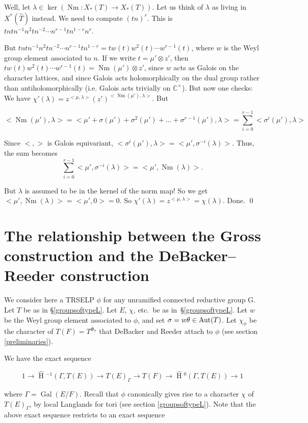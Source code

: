 \documentclass[11pt]{amsart}
\theoremstyle{plain}
\newcommand{\HT}[1]{\hat{\HH}{}^{#1}}
\theoremstyle{definition}
\DeclareMathOperator{\Gal}{Gal}
\DeclareMathOperator{\HH}{H}
\DeclareMathOperator{\Nm}{Nm}
\begin{document}
Well, let $\lambda \in \ker(\Nm : X_*(T) \rightarrow X_*(T))$.  Let us
think of $\lambda$ as living in $X^*(\hat{T})$ instead.  We need to
compute $(tn)^r$.  This is $t ntn^{-1} n^2 t n^{-2} \cdots n^{r-1} t n^{1-r} n^r$.

But $t ntn^{-1} n^2 t n^{-2} \cdots n^{r-1} t n^{1-r} = t w(t) w^2(t) \cdots w^{r-1}(t)$,
where $w$ is the Weyl group element associated to $n$.  If we write
$t = \mu' \otimes z'$, then $t w(t) w^2(t) \cdots w^{r-1}(t) = \Nm(\mu' ) \otimes z'$,
since $w$ acts as Galois on the character lattices, and since Galois
acts holomorphically on the dual group rather than antiholomorphically
(i.e. Galois acts trivially on $\mathbb{C}^\times$).  But now one checks:
We have $\chi'(\lambda) = z^{<\mu, \lambda>} (z' )^{<\Nm(\mu'), \lambda>}$.  But

$$<\Nm(\mu'), \lambda> = < \mu' + \sigma(\mu') + \sigma^2(\mu') + ... + \sigma^{r-1}(\mu'), \lambda>
  = \displaystyle\sum_{i=0}^{r-1} < \sigma^i(\mu'), \lambda >$$

Since $< , >$ is Galois equivariant, $<\sigma^i(\mu'), \lambda> =
<\mu', \sigma^{-i}(\lambda)>$.  Thus, the sum
becomes
$$\displaystyle\sum_{i=0}^{r-1} <\mu', \sigma^{-i}(\lambda)> = <\mu', \Nm(\lambda)>.$$

But $\lambda$ is assumed to be in the kernel of the norm map!  So we
get $<\mu', \Nm(\lambda)> = <\mu', 0> = 0$.  So
$\chi'(\lambda) = z^{<\mu, \lambda>} = \chi(\lambda)$.  Done.
\qed

\section{The relationship between the Gross construction and the DeBacker--Reeder construction}\label{grossdebackerreeder}

We consider here a TRSELP $\phi$ for any unramified connected
reductive group G.  Let $T$ be as in \S\ref{groupsoftypeL}.  Let $E$,
$\chi$, etc.~be as in~\S\ref{groupsoftypeL}.  Let $w$ be the Weyl
group element associated to $\phi$, and set $\sigma = w \theta\in {\rm Aut}(T)$.
Let $\chi_{\phi}$ be the character of $T(F) = T^{\Phi_{\sigma}}$ that
DeBacker and Reeder attach to $\phi$ (see section
\ref{preliminaries}).

We have the exact sequence

$$1 \rightarrow \HT{-1}(\Gamma, T(E)) \rightarrow T(E)_{\Gamma} \rightarrow T(F)
  \rightarrow \HT{0}(\Gamma, T(E)) \rightarrow 1$$

where $\Gamma = \Gal(E/F)$.  Recall that $\phi$ canonically gives
rise to a character $\chi$ of $T(E)_{\Gamma}$, by local Langlands
for tori (see section \ref{groupsoftypeL}).  Note that the above
exact sequence restricts to an exact sequence
\end{document}
